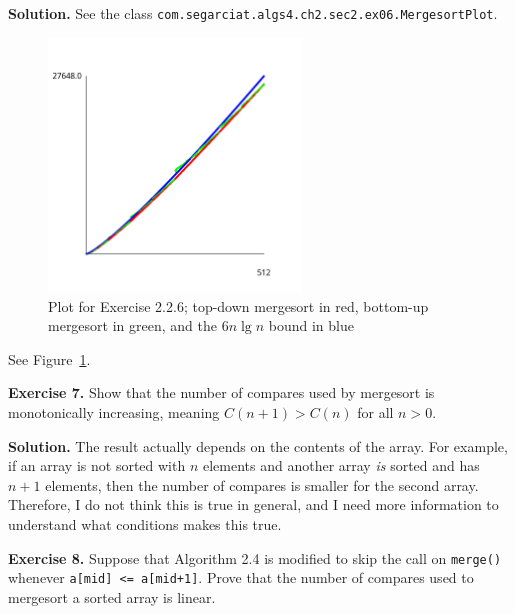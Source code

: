 \documentclass[12pt, a4paper]{article}
\newenvironment{ex}[2][Exercise]
{\par\medskip\noindent \textbf{#1 #2.}}
{\medskip}
\newenvironment{sol}[1][Solution]
{\par\medskip\noindent \textbf{#1.} }
{\medskip}
\begin{document}
	\begin{sol}
		See the class \texttt{com.segarciat.algs4.ch2.sec2.ex06.MergesortPlot}.
		\begin{figure}
			\centering
			\includegraphics[width=0.6\textwidth]{mergesort-array-access-cost-plot}
			\caption{Plot for Exercise 2.2.6; top-down mergesort in red, bottom-up mergesort in green,
			and the $6n\lg n$ bound in blue}
			\label{ex:6}
		\end{figure}
		See Figure~\ref{ex:6}.
	\end{sol}
	\begin{ex}{7}
		Show that the number of compares used by mergesort is monotonically increasing,
		meaning $C(n+1)>C(n)$ for all $n>0$.
	\end{ex}
	\begin{sol}
		The result actually depends on the contents of the array. For example,
		if an array is not sorted with $n$ elements and another array \emph{is} sorted
		and has $n+1$ elements, then the number of compares is smaller for the
		second array. Therefore, I do not think this is true in general, and I need
		more information to understand what conditions makes this true.
	\end{sol}
	\begin{ex}{8}
		Suppose that Algorithm 2.4 is modified to skip the call on \texttt{merge()} whenever
		\texttt{a[mid] <= a[mid+1]}. Prove that the number of compares used to mergesort
		a sorted array is linear.
	\end{ex}
\end{document}
